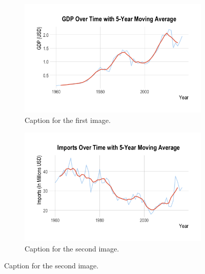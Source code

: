 \documentclass[11pt]{article}
\begin{document}
\begin{figure}[htbp]
  \begin{subfigure}[b]{0.48\textwidth}
    \centering
    \includegraphics[width=\linewidth]{EDA/GDP_MA5.png} %
    \caption{Caption for the first image.}
    \label{fig:side:a}
  \end{subfigure}
  \hfill
  \begin{subfigure}[b]{0.48\textwidth}
    \centering
    \includegraphics[width=\linewidth]{EDA/Imports_MA5.png} %
    \caption{Caption for the second image.}
    \label{fig:side:b}
  \end{subfigure}
  

\end{figure}
\end{document}
